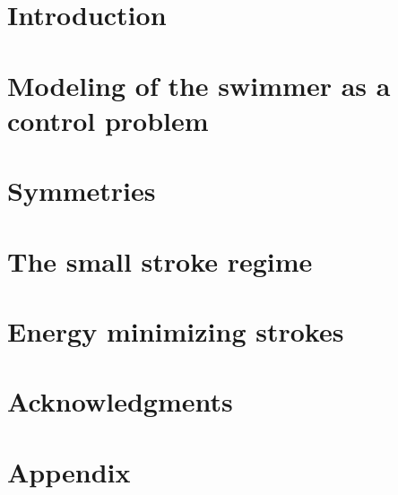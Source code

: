 \documentclass[10pt,a4paper]{article}
\numberwithin{equation}{section}
\theoremstyle{plain}
\theoremstyle{plain}
\theoremstyle{plain}
\theoremstyle{remark}
\theoremstyle{definition}
\theoremstyle{definition}
\theoremstyle{plain}
\theoremstyle{plain}
\begin{document}
\section{Introduction}


\section[Modeling]{Modeling of the swimmer as a control problem}


\section{Symmetries}


\section[The small strokes regime]{The small stroke regime}


\section{Energy minimizing strokes}


%

\section{Acknowledgments}


\newpage
\section{Appendix}



\printbibliography[title = Bibliography]
\end{document}

